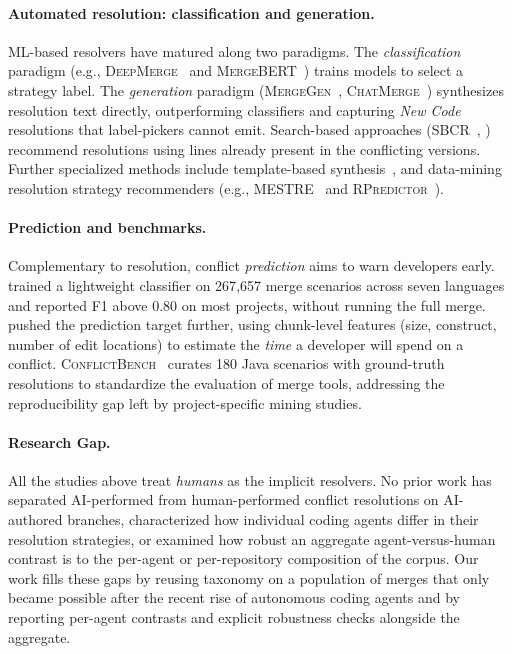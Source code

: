 \documentclass[sigconf,anonymous]{acmart}
\begin{document}
\paragraph{Automated resolution: classification and generation.}
ML-based resolvers have matured along two paradigms. The \emph{classification} paradigm (e.g., \textsc{DeepMerge}~\cite{dinella2022deepmerge} and \textsc{Merge\-BERT}~\cite{svyatkovskiy2022mergebert}) trains models to select a strategy label. The \emph{generation} paradigm (\textsc{MergeGen}~\cite{dong2023mergegen}, \textsc{ChatMerge}~\cite{shen2023chatmerge}) synthesizes resolution text directly, outperforming classifiers and capturing \textit{New Code} resolutions that label-pickers cannot emit. Search-based approaches (\textsc{SBCR}~\cite{camposjunior2024sbcr}, \citet{camposjunior2022sbes}) recommend resolutions using lines already present in the conflicting versions. Further specialized methods include template-based synthesis~\cite{pan2021synthesis}, and data-mining resolution strategy recommenders (e.g., \textsc{MESTRE}~\cite{elias2023mestre} and \textsc{RPredictor}~\cite{aldndni2023rpredictor}).

\paragraph{Prediction and benchmarks.}
Complementary to resolution, conflict \emph{prediction} aims to warn developers early. \citet{owhadikareshk2019} trained a lightweight classifier on 267{,}657 merge scenarios across seven languages and reported F1 above 0.80 on most projects, without running the full merge. \citet{brindescu2020planning} pushed the prediction target further, using chunk-level features (size, construct, number of edit locations) to estimate the \emph{time} a developer will spend on a conflict. \textsc{ConflictBench}~\cite{shenmeng2024conflictbench} curates 180 Java scenarios with ground-truth resolutions to standardize the evaluation of merge tools, addressing the reproducibility gap left by project-specific mining studies.

\paragraph{Research Gap.}
All the studies above treat \emph{humans} as the implicit resolvers. No prior work has separated AI-performed from human-performed conflict resolutions on AI-authored branches, characterized how individual coding agents differ in their resolution strategies, or examined how robust an aggregate agent-versus-human contrast is to the per-agent or per-repository composition of the corpus. Our work fills these gaps by reusing \citet{ghiotto2020nature} taxonomy on a population of merges that only became possible after the recent rise of autonomous coding agents and by reporting per-agent contrasts and explicit robustness checks alongside the aggregate.
\end{document}
